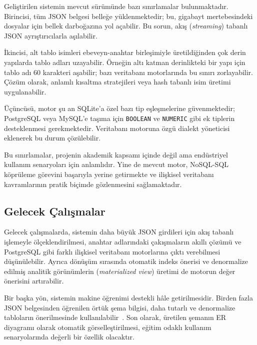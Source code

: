 \documentclass[conference,a4paper,10pt]{IEEEtran}
\begin{document}
Geliştirilen sistemin mevcut sürümünde bazı sınırlamalar bulunmaktadır. Birincisi, tüm JSON belgesi belleğe yüklenmektedir; bu, gigabayt mertebesindeki dosyalar için bellek darboğazına yol açabilir. Bu sorun, akış (\textit{streaming}) tabanlı JSON ayrıştırıcılarla aşılabilir.

İkincisi, alt tablo isimleri ebeveyn-anahtar birleşimiyle üretildiğinden çok derin yapılarda tablo adları uzayabilir. Örneğin altı katman derinlikteki bir yapı için tablo adı 60 karakteri aşabilir; bazı veritabanı motorlarında bu sınırı zorlayabilir. Çözüm olarak, anlamlı kısaltma stratejileri veya hash tabanlı isim üretimi uygulanabilir.

Üçüncüsü, motor şu an SQLite'a özel bazı tip eşleşmelerine güvenmektedir; PostgreSQL veya MySQL'e taşıma için \texttt{BOOLEAN} ve \texttt{NUMERIC} gibi ek tiplerin desteklenmesi gerekmektedir. Veritabanı motoruna özgü dialekt yöneticisi eklenerek bu durum çözülebilir.

Bu sınırlamalar, projenin akademik kapsamı içinde değil ama endüstriyel kullanım senaryoları için anlamlıdır. Yine de mevcut motor, NoSQL-SQL köprüleme görevini başarıyla yerine getirmekte ve ilişkisel veritabanı kavramlarının pratik biçimde gözlenmesini sağlamaktadır.

\subsection{Gelecek Çalışmalar}

Gelecek çalışmalarda, sistemin daha büyük JSON girdileri için akış tabanlı işlemeyle ölçeklendirilmesi, anahtar adlarındaki çakışmaların akıllı çözümü ve PostgreSQL gibi farklı ilişkisel veritabanı motorlarına çıktı verebilmesi düşünülebilir. Ayrıca dönüşüm sırasında otomatik indeks önerisi ve denormalize edilmiş analitik görünümlerin (\textit{materialized view}) üretimi de motorun değer önerisini artırabilir.

Bir başka yön, sistemin makine öğrenimi destekli hâle getirilmesidir. Birden fazla JSON belgesinden öğrenilen örtük şema bilgisi, daha tutarlı ve denormalize tabloların önerilmesinde kullanılabilir~\cite{python}. Son olarak, üretilen şemanın ER diyagramı olarak otomatik görselleştirilmesi, eğitim odaklı kullanım senaryolarında değerli bir özellik olacaktır.
\end{document}
